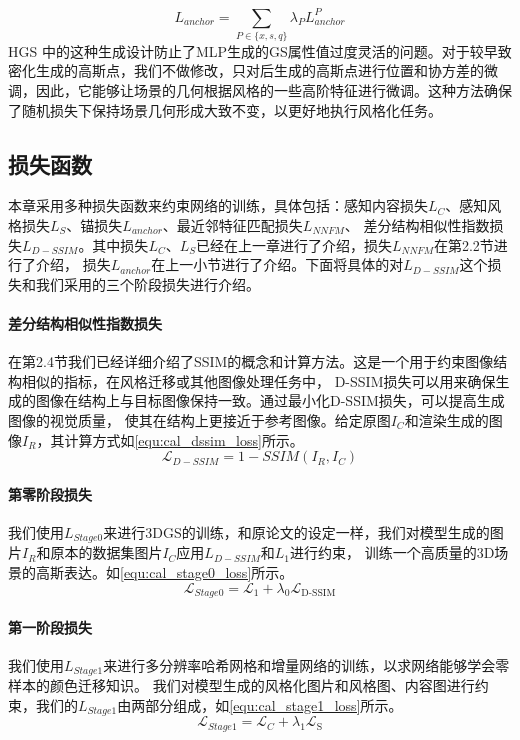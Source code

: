 \begin{equation}
    \label{equ:cal_anchor_L}
    L_{anchor}=\sum_{P\in\{x,s,q\}}\lambda_PL_{anchor}^P
\end{equation}
HGS 中的这种生成设计防止了MLP生成的GS属性值过度灵活的问题。对于较早致密化生成的高斯点，我们不做修改，只对后生成的高斯点进行位置和协方差的微调，因此，它能够让场景的几何根据风格的一些高阶特征进行微调。这种方法确保了随机损失下保持场景几何形成大致不变，以更好地执行风格化任务。
\subsection{损失函数}
本章采用多种损失函数来约束网络的训练，具体包括：感知内容损失$L_C$、感知风格损失$L_S$、锚损失$L_{anchor}$、最近邻特征匹配损失$L_{NNFM}$、
差分结构相似性指数损失$L_{D-SSIM}$。其中损失$L_C$、$L_S$已经在上一章进行了介绍，损失$L_{NNFM}$在第2.2节进行了介绍，
损失$L_{anchor}$在上一小节进行了介绍。下面将具体的对$L_{D-SSIM}$这个损失和我们采用的三个阶段损失进行介绍。
\paragraph{差分结构相似性指数损失}
在第2.4节我们已经详细介绍了SSIM的概念和计算方法。这是一个用于约束图像结构相似的指标，在风格迁移或其他图像处理任务中，
D-SSIM损失可以用来确保生成的图像在结构上与目标图像保持一致。通过最小化D-SSIM损失，可以提高生成图像的视觉质量，
使其在结构上更接近于参考图像。给定原图$I_C$和渲染生成的图像$I_R$，其计算方式如\autoref{equ:cal_dssim_loss}所示。
\begin{equation}
    \label{equ:cal_dssim_loss}
    \mathcal{L}_{D-SSIM}=1-SSIM(I_R,I_C)
\end{equation}
\paragraph{第零阶段损失}
我们使用$L_{Stage0}$来进行3DGS的训练，和原论文的设定一样，我们对模型生成的图片$I_R$和原本的数据集图片$I_C$应用$L_{D-SSIM}$和$L_1$进行约束，
训练一个高质量的3D场景的高斯表达。如\autoref{equ:cal_stage0_loss}所示。
\begin{equation}
    \label{equ:cal_stage0_loss}
    \mathcal{L}_{Stage0}=\mathcal{L}_1+\lambda_0\mathcal{L}_{\text{D-SSIM}}
\end{equation}
\paragraph{第一阶段损失}
我们使用$L_{Stage1}$来进行多分辨率哈希网格和增量网络的训练，以求网络能够学会零样本的颜色迁移知识。
我们对模型生成的风格化图片和风格图、内容图进行约束，我们的$L_{Stage1}$由两部分组成，如\autoref{equ:cal_stage1_loss}所示。
\begin{equation}
    \label{equ:cal_stage1_loss}
    \mathcal{L}_{Stage1}=\mathcal{L}_C+\lambda_1\mathcal{L}_\mathrm{S}
\end{equation}
